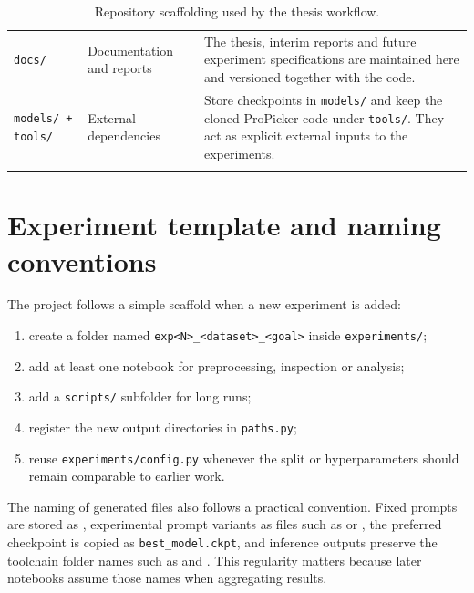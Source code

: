\documentclass[12pt,a4paper]{report}
\begin{document}
\begin{longtable}{P{0.22\textwidth}P{0.26\textwidth}P{0.42\textwidth}}
  \texttt{docs/} & Documentation and reports & The thesis, interim reports and future experiment specifications are maintained here and versioned together with the code. \\
  \texttt{models/ + tools/} & External dependencies & Store checkpoints in \texttt{models/} and keep the cloned ProPicker code under \texttt{tools/}. They act as explicit external inputs to the experiments. \\
  \bottomrule
  \caption{Repository scaffolding used by the thesis workflow.}
  \label{tab:repo-scaffolding}
\end{longtable}
\normalsize

\section{Experiment template and naming conventions}
The project follows a simple scaffold when a new experiment is added:
\begin{enumerate}
  \item create a folder named \texttt{exp<N>\_<dataset>\_<goal>} inside \texttt{experiments/};
  \item add at least one notebook for preprocessing, inspection or analysis;
  \item add a \texttt{scripts/} subfolder for long runs;
  \item register the new output directories in \texttt{paths.py};
  \item reuse \texttt{experiments/config.py} whenever the split or hyperparameters should remain comparable to earlier work.
\end{enumerate}

The naming of generated files also follows a practical convention. Fixed prompts are stored as , experimental prompt variants as files such as  or , the preferred checkpoint is copied as \texttt{best\_model.ckpt}, and inference outputs preserve the toolchain folder names such as  and . This regularity matters because later notebooks assume those names when aggregating results.
\end{document}
